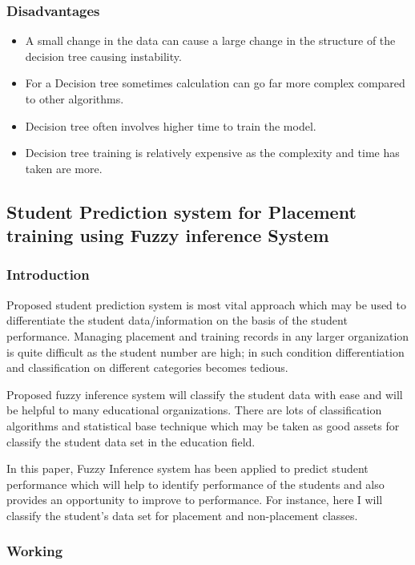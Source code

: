 \documentclass[12pt]{article}
\begin{document}
\subsubsection{Disadvantages}
\begin{itemize}
\item A small change in the data can cause a large change in the structure of the decision tree causing instability.
\item For a Decision tree sometimes calculation can go far more complex compared to other algorithms.
\item Decision tree often involves higher time to train the model.
\item Decision tree training is relatively expensive as the complexity and time has taken are more.
\end{itemize}
\newpage
\subsection{Student Prediction system for Placement training using Fuzzy inference System}
\vspace*{10px}
\subsubsection{Introduction}

Proposed student prediction system is most vital approach which may 
be used to differentiate the student data/information on the basis of the 
student performance. Managing placement and training records in 
any larger organization is quite difficult as the student number are 
high; in such condition differentiation and classification on different 
categories becomes tedious. 

Proposed fuzzy inference system will classify the student data with ease and will be helpful to many 
educational organizations. There are lots of classification algorithms 
and statistical base technique which may be taken as good assets for 
classify the student data set in the education field. 

In this paper, Fuzzy Inference system has been applied to predict student performance 
which will help to identify performance of the students and also 
provides an opportunity to improve to performance. For instance, here 
I will classify the student’s data set for placement and non-placement 
classes.
\newpage
\subsubsection{Working}
\end{document}
